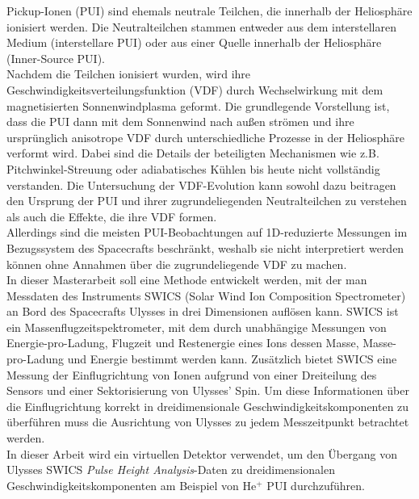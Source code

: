 \documentclass[
11pt, %
english, %
singlespacing, %
headsepline, %
consistentlayout, %
]{MastersDoctoralThesis} %
\begin{document}
\begin{abstractd}
	Pickup-Ionen (PUI) sind ehemals neutrale Teilchen, die innerhalb der Heliosphäre ionisiert werden. Die Neutralteilchen stammen entweder aus dem interstellaren Medium (interstellare PUI) oder aus einer Quelle innerhalb der Heliosphäre (Inner-Source PUI).\\
	Nachdem die Teilchen ionisiert wurden, wird ihre Geschwindigkeitsverteilungsfunktion (VDF) durch Wechselwirkung mit dem magnetisierten Sonnenwindplasma geformt. Die grundlegende Vorstellung ist, dass die PUI dann mit dem Sonnenwind nach außen strömen und ihre ursprünglich anisotrope VDF durch unterschiedliche Prozesse in der Heliosphäre verformt wird.
	Dabei sind die Details der beteiligten Mechanismen wie z.B. Pitchwinkel-Streuung oder adiabatisches Kühlen bis heute nicht vollständig verstanden.
	Die Untersuchung der VDF-Evolution kann sowohl dazu beitragen den Ursprung der PUI und ihrer zugrundeliegenden Neutralteilchen zu verstehen als auch die Effekte, die ihre VDF formen.\\
	Allerdings sind die meisten PUI-Beobachtungen auf 1D-reduzierte Messungen im Bezugssystem des Spacecrafts beschränkt, weshalb sie nicht interpretiert werden können ohne Annahmen über die zugrundeliegende VDF zu machen.
	\\
	In dieser Masterarbeit soll eine Methode entwickelt werden, mit der man Messdaten des Instruments SWICS (Solar Wind Ion Composition Spectrometer) an Bord des Spacecrafts Ulysses in drei Dimensionen auflösen kann.
	SWICS ist ein Massenflugzeitspektrometer, mit dem durch unabhängige Messungen von Energie-pro\--La\-dung, Flugzeit und Restenergie eines Ions dessen Masse, Masse-pro-Ladung und Energie bestimmt werden kann. Zusätzlich bietet SWICS eine Messung der Einflugrichtung von Ionen aufgrund von einer Dreiteilung des Sensors und einer Sektorisierung von Ulysses' Spin.  
	Um diese Informationen über die Einflugrichtung kor\-rekt in dreidimensionale Geschwindigkeitskomponenten zu überführen muss die Ausrichtung von Ulysses zu jedem Messzeitpunkt betrachtet werden.
	\\
	In dieser Arbeit wird ein virtuellen Detektor verwendet, um den Übergang von Ulysses SWICS \textit{Pulse Height Analysis}-Daten zu dreidimensionalen Geschwindigkeits\-komponenten am Beispiel von $\mathrm{He^+}$ PUI durchzuführen.	
\end{abstractd}

\end{document}
